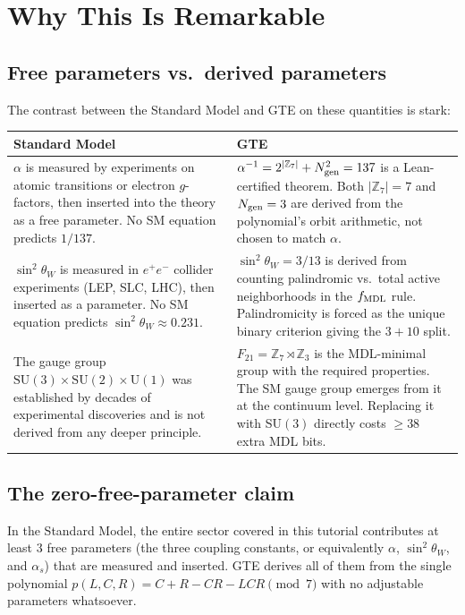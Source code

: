 \documentclass[11pt,a4paper]{article}
\newcommand{\sinwsq}{\sin^2\!\theta_W}
\newcommand{\ZS}{\mathbb{Z}_7}
\newcommand{\Ngen}{N_{\rm gen}}
\begin{document}
\section{Why This Is Remarkable}

\subsection{Free parameters vs.\ derived parameters}

The contrast between the Standard Model and GTE on these quantities is stark:

\begin{center}
\begin{tabular}{p{5.5cm}p{5.5cm}}
\toprule
\textbf{Standard Model} & \textbf{GTE} \\
\midrule
$\alpha$ is measured by experiments on atomic transitions or
electron $g$-factors, then inserted into the theory as a free parameter.
No SM equation predicts $1/137$.
&
$\alpha^{-1} = 2^{|\ZS|} + \Ngen^2 = 137$ is a Lean-certified theorem.
Both $|\ZS| = 7$ and $\Ngen = 3$ are derived from the polynomial's orbit
arithmetic, not chosen to match $\alpha$.
\\[4pt]
$\sinwsq$ is measured in $e^+e^-$ collider experiments
(LEP, SLC, LHC), then inserted as a parameter.
No SM equation predicts $\sinwsq \approx 0.231$.
&
$\sinwsq = 3/13$ is derived from counting palindromic vs.\ total
active neighborhoods in the $f_{\rm MDL}$ rule.  Palindromicity is forced
as the unique binary criterion giving the $3 + 10$ split.
\\[4pt]
The gauge group $\mathrm{SU}(3)\times\mathrm{SU}(2)\times\mathrm{U}(1)$
was established by decades of experimental discoveries and is not
derived from any deeper principle.
&
$F_{21} = \ZS\rtimes\mathbb{Z}_3$ is the MDL-minimal group with the
required properties.  The SM gauge group emerges from it at the
continuum level.  Replacing it with SU$(3)$ directly costs $\geq 38$
extra MDL bits.
\\
\bottomrule
\end{tabular}
\end{center}

\subsection{The zero-free-parameter claim}

In the Standard Model, the entire sector covered in this tutorial
contributes at least 3 free parameters (the three coupling constants, or
equivalently $\alpha$, $\sinwsq$, and $\alpha_s$) that are measured
and inserted.  GTE derives all of them from the single polynomial
$p(L,C,R) = C + R - CR - LCR \pmod 7$ with no adjustable parameters
whatsoever.
\end{document}
